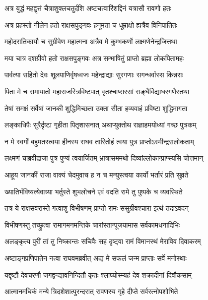 \twolineshloka
{अत्र युद्धं महद्वृत्तं चैत्राशुक्लचतुर्दशि}
{अष्टचत्वारिंशद्दिनं यत्रासौ रावणो हतः}%

\twolineshloka
{अत्र प्रहस्तो नीलेन हतो राक्षसपुङ्गवः}
{हनूमता च धूम्राक्षो ह्यत्रैव विनिपातितः}%

\twolineshloka
{महोदरातिकायौ च सुग्रीवेण महात्मना}
{अत्रैव मे कुम्भकर्णो लक्ष्मणेनेन्द्रजित्तथा}%

\twolineshloka
{मया चात्र दशग्रीवो हतो राक्षसपुङ्गवः}
{अत्र सम्भाषितुं प्राप्तो ब्रह्मा लोकपितामहः}%

\twolineshloka
{पार्वत्या सहितो देवः शूलपाणिर्वृषध्वजः}
{महेन्द्राद्याः सुरगणाः सगन्धर्वास्स किन्नराः}%

\twolineshloka
{पिता मे च समायातो महाराजस्त्रिविष्टपात्}
{वृतश्चाप्सरसां सङ्घैर्विद्याधरगणैस्तथा}%

\twolineshloka
{तेषां समक्षं सर्वेषां जानकी शुद्धिमिच्छता}
{उक्ता सीता हव्यवाहं प्रविष्टा शुद्धिमागता}%

\twolineshloka
{लङ्काधिपैः सुरैर्दृष्टा गृहीता पितृशासनात्}
{अथाप्युक्तोथ राज्ञाहमयोध्यां गच्छ पुत्रकम्}%

\twolineshloka
{न मे स्वर्गो बहुमतस्त्वया हीनस्य राघव}
{तारितोहं त्वया पुत्र प्राप्तोऽस्मीन्द्रसलोकताम्}%

\twolineshloka
{लक्ष्मणं चाब्रवीद्राजा पुत्र पुण्यं त्वयार्जितम्}
{भ्रात्रासममथो दिव्यांल्लोकान्प्राप्स्यसि चोत्तमान्}%

\twolineshloka
{आहूय जानकीं राजा वाक्यं चेदमुवाच ह}
{न च मन्युस्त्वया कार्यो भर्तारं प्रति सुव्रते}%

\twolineshloka
{ख्यातिर्भविष्यत्येवाग्र्या भर्तुस्ते शुभलोचने}
{एवं वदति रामे तु पुष्पके च व्यवस्थिते}%

\twolineshloka
{तत्र ये राक्षसवरास्ते गत्वाशु विभीषणम्}
{प्राप्तो रामः ससुग्रीवश्चारा इत्थं तदाऽवदन्}%

\twolineshloka
{विभीषणस्तु तच्छ्रुत्वा रामागमनमन्तिके}
{चारांस्तान्पूजयामास सर्वकामधनादिभिः}%

\twolineshloka
{अलङ्कृत्य पुरीं तां तु निष्क्रान्तः सचिवैः सह}
{दृष्ट्वा रामं विमानस्थं मेराविव दिवाकरम्}%

\twolineshloka
{अष्टाङ्गप्रणिपातेन नत्वा राघवमब्रवीत्}
{अद्य मे सफलं जन्म प्राप्ताः सर्वे मनोरथाः}%

\twolineshloka
{यद्दृष्टौ देवचरणौ जगद्वन्द्यावनिन्दितौ}
{कृतः श्लाघ्योस्म्यहं देव शक्रादीनां दिवौकसाम्}%

\twolineshloka
{आत्मानमधिकं मन्ये त्रिदशेशात्पुरन्दरात्}
{रावणस्य गृहे दीप्ते सर्वरत्नोपशोभिते}%

